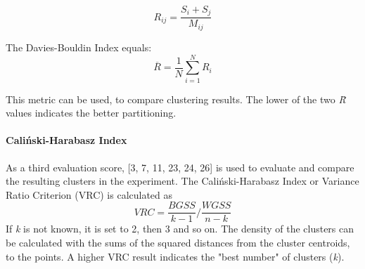 \[
  R_{ij} = \frac{S_i + S_j}{M_{ij}}  
\]

The Davies-Bouldin Index equals:
\[
\overline{R} = \frac{1}{N}\sum_{i=1}^{N}R_i
\]

This metric can be used, to compare clustering results. The lower of the two \textit{\=R} values indicates the better partitioning.

\paragraph{Caliński-Harabasz Index}
As a third evaluation score, \textcite{calinskiHarabasz}[3, 7, 11, 23, 24, 26] is used to evaluate and compare the resulting clusters in the experiment. 
The Caliński-Harabasz Index or Variance Ratio Criterion (VRC) is calculated as 
\[
VRC = \frac{BGSS}{k-1}/\frac{WGSS}{n-k}
\]
If \textit{k} is not known, it is set to 2, then 3 and so on. The density of the clusters can be calculated with the sums of the squared distances from the cluster centroids, to the points. A higher VRC result indicates the "best number" of clusters (\textit{k}).






  